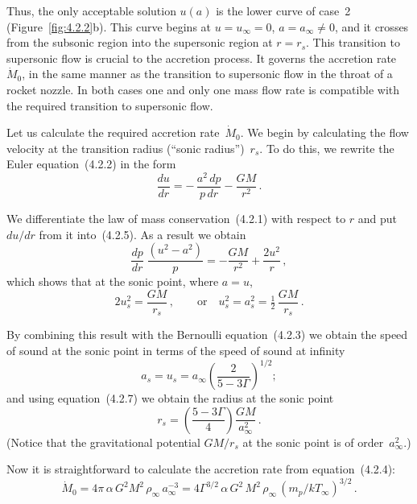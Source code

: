 Thus, the only acceptable solution $u(a)$ is the lower curve of case~2
(Figure~\ref{fig:4.2.2}b).  This curve begins at $u = u_\infty = 0$,
$a = a_\infty \neq 0$, and it crosses from the subsonic region into the
supersonic region at $r = r_s$.  This transition to supersonic flow is
crucial to the accretion process.  It governs the accretion rate~$\dot{M}_0$,
in the same manner as the transition to supersonic flow in the throat of a
rocket nozzle.  In both cases one and only one mass flow rate is compatible
with the required transition to supersonic flow.

Let us calculate the required accretion rate~$\dot{M}_0$.  We begin by
calculating the flow velocity at the transition radius (``sonic
radius'')~$r_s$.  To do this, we rewrite the Euler equation~(4.2.2) in the
form
\begin{equation}
\frac{du}{dr} = -\,\frac{a^2\,dp}{p\,dr} - \frac{GM}{r^2}\,.
\tag{4.2.5}
\end{equation}

We differentiate the law of mass conservation~(4.2.1) with respect to $r$
and put $du/dr$ from it into~(4.2.5).  As a result we obtain
\begin{equation}
\frac{dp}{dr}\;\frac{(u^2 - a^2)}{p}
  = -\frac{GM}{r^2} + \frac{2u^2}{r}\,,
\tag{4.2.6}
\end{equation}
%
which shows that at the sonic point, where $a = u$,
\begin{equation}
2u_s^2 = \frac{GM}{r_s}\,,\qquad \text{or} \quad
u_s^2 = a_s^2 = \tfrac{1}{2}\,\frac{GM}{r_s}\,.
\tag{4.2.7}
\end{equation}

By combining this result with the Bernoulli equation~(4.2.3) we obtain the
speed of sound at the sonic point in terms of the speed of sound at infinity
\begin{equation}
a_s = u_s = a_\infty \left(\frac{2}{5-3\Gamma}\right)^{1/2}\!;
\tag{4.2.8}
\end{equation}
%
and using equation~(4.2.7) we obtain the radius at the sonic point
\begin{equation}
r_s = \left(\frac{5-3\Gamma}{4}\right)\frac{GM}{a_\infty^2}\,.
\tag{4.2.9}
\end{equation}
%
(Notice that the gravitational potential $GM/r_s$ at the sonic point is of
order~$a_\infty^2$.)

Now it is straightforward to calculate the accretion rate from
equation~(4.2.4):
\begin{equation}
\dot{M}_0 = 4\pi\,\alpha\,G^2 M^2\,\rho_\infty\,a_\infty^{-3}
= 4\Gamma^{3/2}\,\alpha\,G^2\,M^2\,\rho_\infty\,
  (m_p / k T_\infty)^{3/2}\,.
\tag{4.2.10}
\end{equation}

